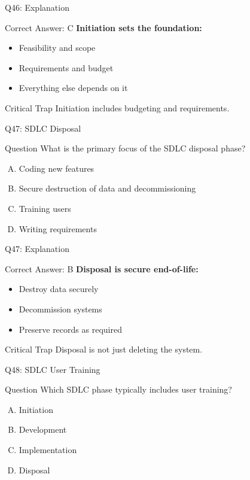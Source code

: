 \documentclass{beamer}
\begin{document}
	\begin{frame}{Q46: Explanation}
		\begin{block}{Correct Answer: C}
			\textbf{Initiation sets the foundation:}
			\begin{itemize}
				\item Feasibility and scope
				\item Requirements and budget
				\item Everything else depends on it
			\end{itemize}
		\end{block}
		\begin{alertblock}{Critical Trap}
			Initiation includes budgeting and requirements.
		\end{alertblock}
	\end{frame}
	
	\begin{frame}{Q47: SDLC Disposal}
		\begin{block}{Question}
			What is the primary focus of the SDLC disposal phase?
		\end{block}
		\begin{enumerate}[(A)]
			\item Coding new features
			\item Secure destruction of data and decommissioning
			\item Training users
			\item Writing requirements
		\end{enumerate}
	\end{frame}
	
	\begin{frame}{Q47: Explanation}
		\begin{block}{Correct Answer: B}
			\textbf{Disposal is secure end-of-life:}
			\begin{itemize}
				\item Destroy data securely
				\item Decommission systems
				\item Preserve records as required
			\end{itemize}
		\end{block}
		\begin{alertblock}{Critical Trap}
			Disposal is not just deleting the system.
		\end{alertblock}
	\end{frame}
	
	\begin{frame}{Q48: SDLC User Training}
		\begin{block}{Question}
			Which SDLC phase typically includes user training?
		\end{block}
		\begin{enumerate}[(A)]
			\item Initiation
			\item Development
			\item Implementation
			\item Disposal
		\end{enumerate}
	\end{frame}
	
\end{document}

